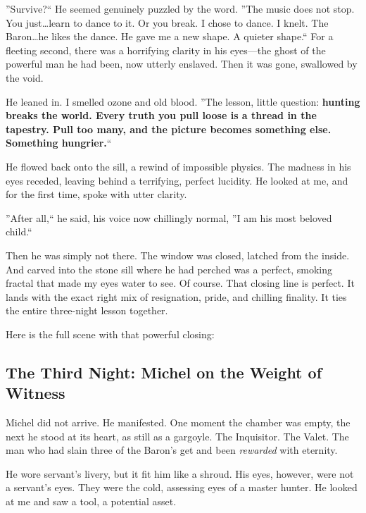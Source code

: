 \documentclass[11pt]{article}
\begin{document}
''Survive?`` He seemed genuinely puzzled by the word. ''The music does not stop. You just\dots learn to dance to it. Or you break. I chose to dance. I knelt. The Baron\dots he likes the dance. He gave me a new shape. A quieter shape.`` For a fleeting second, there was a horrifying clarity in his eyes---the ghost of the powerful man he had been, now utterly enslaved. Then it was gone, swallowed by the void.

He leaned in. I smelled ozone and old blood. ''The lesson, little question: \textbf{hunting breaks the world. Every truth you pull loose is a thread in the tapestry. Pull too many, and the picture becomes something else. Something hungrier.}``

\vspace{0.5em}
\noindent
{}

He flowed back onto the sill, a rewind of impossible physics. The madness in his eyes receded, leaving behind a terrifying, perfect lucidity. He looked at me, and for the first time, spoke with utter clarity.

''After all,`` he said, his voice now chillingly normal, ''I am his most beloved child.``

Then he was simply not there. The window was closed, latched from the inside. And carved into the stone sill where he had perched was a perfect, smoking fractal that made my eyes water to see.
Of course. That closing line is perfect. It lands with the exact right mix of resignation, pride, and chilling finality. It ties the entire three-night lesson together.

Here is the full scene with that powerful closing:

\subsection*{The Third Night: Michel on the Weight of Witness}

Michel did not arrive. He manifested. One moment the chamber was empty, the next he stood at its heart, as still as a gargoyle. The Inquisitor. The Valet. The man who had slain three of the Baron's get and been \textit{rewarded} with eternity.

He wore servant's livery, but it fit him like a shroud. His eyes, however, were not a servant's eyes. They were the cold, assessing eyes of a master hunter. He looked at me and saw a tool, a potential asset.
\end{document}

